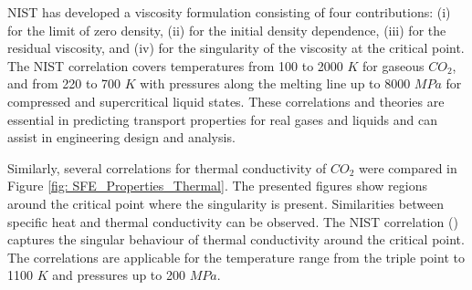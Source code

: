 \documentclass[../Article_Model_Parameters.tex]{subfiles}
\begin{document}
	NIST has developed a viscosity formulation consisting of four contributions: (i) for the limit of zero density, (ii) for the initial density dependence, (iii) for the residual viscosity, and (iv) for the singularity of the viscosity at the critical point. The NIST correlation covers temperatures from 100 to 2000 $K$ for gaseous $CO_2$, and from 220 to 700 $K$ with pressures along the melting line up to 8000 $MPa$ for compressed and supercritical liquid states. These correlations and theories are essential in predicting transport properties for real gases and liquids and can assist in engineering design and analysis.
	
	Similarly, several correlations for thermal conductivity of $CO_2$ were compared in Figure \ref{fig: SFE_Properties_Thermal}. The presented figures show regions around the critical point where the singularity is present. Similarities between specific heat and thermal conductivity can be observed. The NIST correlation (\citet{Huber2016}) captures the singular behaviour of thermal conductivity around the critical point. The correlations are applicable for the temperature range from the triple point to 1100 $K$ and pressures up to 200 $MPa$. 
	
	
\end{document}
